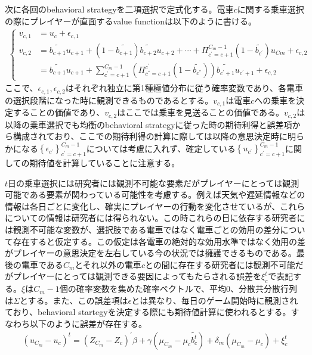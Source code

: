 \documentclass{jsarticle}
\begin{document}
次に各回のbehavioral strategyを二項選択で定式化する。電車$c$に関する乗車選択の際にプレイヤーが直面するvalue functionは以下のように書ける。
\begin{align*}
	\begin{cases}
	v_{c, 1} &= u_c + \epsilon_{c, 1}\\[8pt]
	v_{c, 2} &= \tilde{b_{c+1}} u_{c+1} + (1 - \tilde{b_{c+1}}) \tilde{b_{c+2}} u_{c+2} + \cdots + \Pi_{c^{'} = c+1}^{C_m-1}(1 - \tilde{b_{c^{'}}}) u_{Cm} + \epsilon_{c, 2}\\[8pt]
	&= \tilde{b_{c+1}} u_{c+1} + \sum_{c^{'}=c+1}^{C_m-1} \left( \Pi_{c^{''} = c+1}^{c^{'}} (1 - \tilde{b_{c^{''}}}) \right) \tilde{b_{c^{'} + 1}} u_{c^{'} + 1} + \epsilon_{c, 2}
	\end{cases}
\end{align*}
ここで、$\epsilon_{c, 1}, \epsilon_{c, 2}$はそれぞれ独立に第1種極値分布に従う確率変数であり、各電車の選択段階になった時に観測できるものであるとする。$v_{c, 1}$は電車$c$への乗車を決定することの価値であり、$v_{c, 2}$はここでは乗車を見送ることの価値である。$v_{c, 2}$は以降の乗車選択でも均衡のbehavioral strategyに従った時の期待利得と誤差項から構成されており、ここでの期待利得の計算に際しては以降の意思決定時に明らかになる$\left\{ \epsilon_{c^{'}} \right\}_{c^{'} = c+1}^{C_m-1}$については考慮に入れず、確定している$\left\{ u_{c^{'}} \right\}_{c^{'} = c+1}^{C_m-1}$に関しての期待値を計算していることに注意する。

$t$日の乗車選択には研究者には観測不可能な要素だがプレイヤーにとっては観測可能である要素が関わっている可能性を考慮する。例えば天気や遅延情報などの情報は各日ごとに変化し、確実にプレイヤーの行動を変化させているが、これらについての情報は研究者には得られない。この時これらの日に依存する研究者には観測不可能な変数が、選択肢である電車ではなく電車ごとの効用の差分について存在すると仮定する。この仮定は各電車の絶対的な効用水準ではなく効用の差がプレイヤーの意思決定を左右している今の状況では擁護できるものである。最後の電車である$C_m$とそれ以外の電車$c$との間に存在する研究者には観測不可能だがプレイヤーにとっては観測できる要因によってもたらされる誤差を$\xi_c^t$で表記する。$\xi$は$C_m-1$個の確率変数を集めた確率ベクトルで、平均0、分散共分散行列は$\Sigma$とする。また、この誤差項は$\epsilon$とは異なり、毎日のゲーム開始時に観測されており、behavioral startegyを決定する際にも期待値計算に使われるとする。すなわち以下のように誤差が存在する。
\begin{align*}
	(u_{C_m} - u_c)^t = (Z_{C_m} - Z_c)^{'} \beta + \gamma (\mu_{C_m} - \mu_{c} \tilde{b_c^t}) + \delta_m (\mu_{C_m} - \mu_c) + \xi_c^t
\end{align*}
\end{document}
